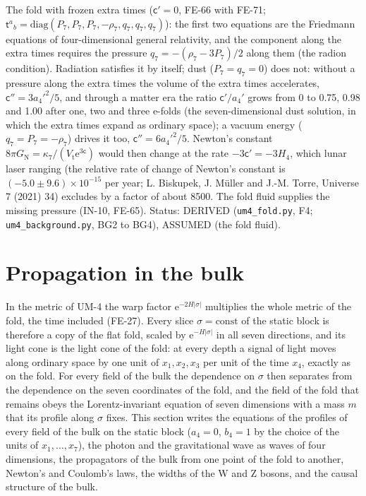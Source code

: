 \documentclass[
  10pt,
]{article}
\begin{document}
The fold with frozen extra times (\(\mathsf{c}' = 0\), FE-66 with FE-71;
\(\mathsf{t}^a{}_b = \mathrm{diag}(P_7, P_7, P_7, -\rho_7, q_7, q_7, q_7)\)):
the first two equations are the Friedmann equations of four-dimensional
general relativity, and the component along the extra times requires the
pressure \(q_7 = -(\rho_7 - 3P_7)/2\) along them (the radion condition).
Radiation satisfies it by itself; dust (\(P_7 = q_7 = 0\)) does not:
without a pressure along the extra times the volume of the extra times
accelerates, \(\mathsf{c}'' = 3a_4'^2/5\), and through a matter era the
ratio \(\mathsf{c}'/a_4'\) grows from 0 to 0.75, 0.98 and 1.00 after
one, two and three e-folds (the seven-dimensional dust solution, in
which the extra times expand as ordinary space); a vacuum energy
(\(q_7 = P_7 = -\rho_7\)) drives it too, \(\mathsf{c}'' = 6a_4'^2/5\).
Newton's constant
\(8\pi G_{\mathrm{N}} = \kappa_7/(V_{\mathrm{t}}\mathrm{e}^{3\mathsf{c}})\)
would then change at the rate \(-3\mathsf{c}' = -3H_4\), which lunar
laser ranging (the relative rate of change of Newton's constant is
\((-5.0 \pm 9.6)\times10^{-15}\) per year; L. Biskupek, J. Müller and
J.-M. Torre, Universe 7 (2021) 34) excludes by a factor of about 8500.
The fold fluid supplies the missing pressure (IN-10, FE-65). Status:
DERIVED (\texttt{um4\_fold.py}, F4; \texttt{um4\_background.py}, BG2 to
BG4), ASSUMED (the fold fluid).

\hypertarget{propagation-in-the-bulk}{%
\section{Propagation in the bulk}\label{propagation-in-the-bulk}}

In the metric of UM-4 the warp factor
\(\mathrm{e}^{-2H\lvert\sigma\rvert}\) multiplies the whole metric of
the fold, the time included (FE-27). Every slice
\(\sigma = \text{const}\) of the static block is therefore a copy of the
flat fold, scaled by \(\mathrm{e}^{-H\lvert\sigma\rvert}\) in all seven
directions, and its light cone is the light cone of the fold: at every
depth a signal of light moves along ordinary space by one unit of
\(x_1, x_2, x_3\) per unit of the time \(x_4\), exactly as on the fold.
For every field of the bulk the dependence on \(\sigma\) then separates
from the dependence on the seven coordinates of the fold, and the field
of the fold that remains obeys the Lorentz-invariant equation of seven
dimensions with a mass \(m\) that its profile along \(\sigma\) fixes.
This section writes the equations of the profiles of every field of the
bulk on the static block (\(a_4 = 0\), \(b_4 = 1\) by the choice of the
units of \(x_1, \dots, x_7\)), the photon and the gravitational wave as
waves of four dimensions, the propagators of the bulk from one point of
the fold to another, Newton's and Coulomb's laws, the widths of the W
and Z bosons, and the causal structure of the bulk.
\end{document}
